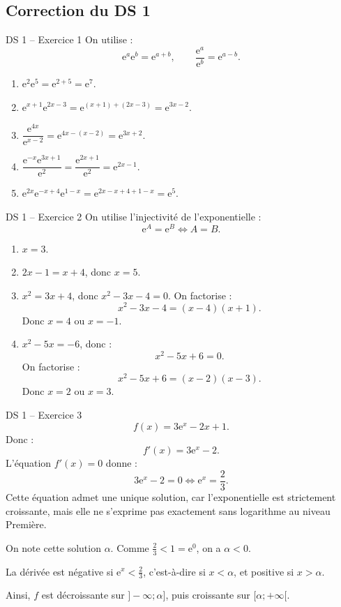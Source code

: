 \documentclass[11pt,a4paper]{article}
\newcommand{\e}{\mathrm{e}}
\begin{document}
\subsection{Correction du DS 1}

\begin{correctionbox}{DS 1 -- Exercice 1}
On utilise :
\[
\e^a\e^b=\e^{a+b},
\qquad
\frac{\e^a}{\e^b}=\e^{a-b}.
\]
\begin{enumerate}
    \item $\e^2\e^5=\e^{2+5}=\e^7$.
    \item $\e^{x+1}\e^{2x-3}=\e^{(x+1)+(2x-3)}=\e^{3x-2}$.
    \item $\dfrac{\e^{4x}}{\e^{x-2}}=\e^{4x-(x-2)}=\e^{3x+2}$.
    \item $\dfrac{\e^{-x}\e^{3x+1}}{\e^2}
    =\dfrac{\e^{2x+1}}{\e^2}
    =\e^{2x-1}$.
    \item $\e^{2x}\e^{-x+4}\e^{1-x}
    =\e^{2x-x+4+1-x}
    =\e^5$.
\end{enumerate}
\end{correctionbox}

\begin{correctionbox}{DS 1 -- Exercice 2}
On utilise l'injectivité de l'exponentielle :
\[
\e^A=\e^B \Longleftrightarrow A=B.
\]
\begin{enumerate}
    \item $x=3$.
    \item $2x-1=x+4$, donc $x=5$.
    \item $x^2=3x+4$, donc $x^2-3x-4=0$.
    On factorise :
    \[
    x^2-3x-4=(x-4)(x+1).
    \]
    Donc $x=4$ ou $x=-1$.
    \item $x^2-5x=-6$, donc :
    \[
    x^2-5x+6=0.
    \]
    On factorise :
    \[
    x^2-5x+6=(x-2)(x-3).
    \]
    Donc $x=2$ ou $x=3$.
\end{enumerate}
\end{correctionbox}

\begin{correctionbox}{DS 1 -- Exercice 3}
\[
f(x)=3\e^x-2x+1.
\]
Donc :
\[
f'(x)=3\e^x-2.
\]
L'équation $f'(x)=0$ donne :
\[
3\e^x-2=0
\Longleftrightarrow
\e^x=\frac{2}{3}.
\]
Cette équation admet une unique solution, car l'exponentielle est strictement croissante, mais elle ne s'exprime pas exactement sans logarithme au niveau Première.

On note cette solution $\alpha$. Comme $\frac23<1=\e^0$, on a $\alpha<0$.

La dérivée est négative si $\e^x<\frac23$, c'est-à-dire si $x<\alpha$, et positive si $x>\alpha$.

Ainsi, $f$ est décroissante sur $]-\infty;\alpha]$, puis croissante sur $[\alpha;+\infty[$.
\end{correctionbox}
\end{document}
